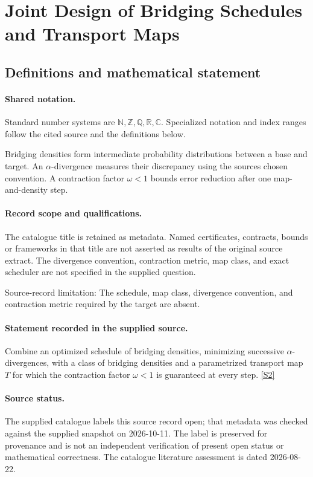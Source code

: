 \documentclass[11pt]{article}
\newcommand{\sref}[2]{\hyperlink{source:#1:#2}{[S#2]}}
\begin{document}
\section{Joint Design of Bridging Schedules and Transport Maps}\label{statement}

\subsection{Definitions and mathematical statement}

\paragraph{Shared notation.}Standard number systems are $\mathbb N,\mathbb Z,\mathbb Q,\mathbb R,\mathbb C$. Specialized notation and index ranges follow the cited source and the definitions below.


Bridging densities form intermediate probability distributions between a base and target. An $\alpha$-divergence measures their discrepancy using the source\textquotesingle s chosen convention. A contraction factor $\omega<1$ bounds error reduction after one map-and-density step.
\paragraph{Record scope and qualifications.}
The catalogue title is retained as metadata. Named certificates, contracts, bounds or frameworks in that title are not asserted as results of the original source extract.
The divergence convention, contraction metric, map class, and exact scheduler are not specified in the supplied question.

Source-record limitation: The schedule, map class, divergence convention, and contraction metric required by the target are absent.
\paragraph{Statement recorded in the supplied source.}
Combine an optimized schedule of bridging densities, minimizing successive $\alpha$-divergences, with a class of bridging densities and a parametrized transport map $T$ for which the contraction factor $\omega<1$ is guaranteed at every step. \sref{statement}{2}
\paragraph{Source status.}
The supplied catalogue labels this source record open; that metadata was checked against the supplied snapshot on 2026-10-11. The label is preserved for provenance and is not an independent verification of present open status or mathematical correctness. The catalogue literature assessment is dated 2026-08-22.
\end{document}
